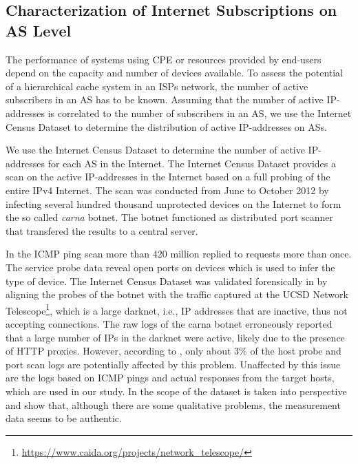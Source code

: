 %

\subsection{Characterization of Internet Subscriptions on AS Level}\label{sec:aslevel:census}

The performance of systems using CPE or resources provided by end-users depend on the capacity and number of devices available.
To assess the potential of a hierarchical cache system in an ISPs network, the number of active subscribers in an AS has to be known.
Assuming that the number of active IP-addresses is correlated to the number of subscribers in an AS, we use the Internet Census Dataset to determine the distribution of active IP-addresses on ASs.

We use the Internet Census Dataset \cite{carna2013} to determine the number of active IP-addresses for each AS in the Internet.
The Internet Census Dataset provides a scan on the active IP-addresses in the Internet based on a full probing of the entire IPv4 Internet.
The scan was conducted from June to October 2012 by infecting several hundred thousand unprotected devices on the Internet to form the so called \emph{carna} botnet.
The botnet functioned as distributed port scanner that transfered the results to a central server.

In the ICMP ping scan more than 420 million replied to requests more than once.
The service probe data reveal open ports on devices which is used to infer the type of device.
The Internet Census Dataset was validated forensically in \cite{dainotticaida} by aligning the probes of the botnet with the traffic captured at the UCSD Network Telescope\footnote{\url{https://www.caida.org/projects/network_telescope/}}, which is a large darknet, i.e., IP addresses that are inactive, thus not accepting connections.
The raw logs of the carna botnet erroneously reported that a large number of IPs in the darknet were active, likely due to the presence of HTTP proxies.
However, according to \cite{dainotticaida}, only about 3\% of the host probe and port scan logs are potentially affected by this problem.
Unaffected by this issue are the logs based on ICMP pings and actual responses from the target hosts, which are used in our study.
In \cite{krenc2014internet} the scope of the dataset is taken into perspective and show that, although there are some qualitative problems, the measurement data seems to be authentic.

